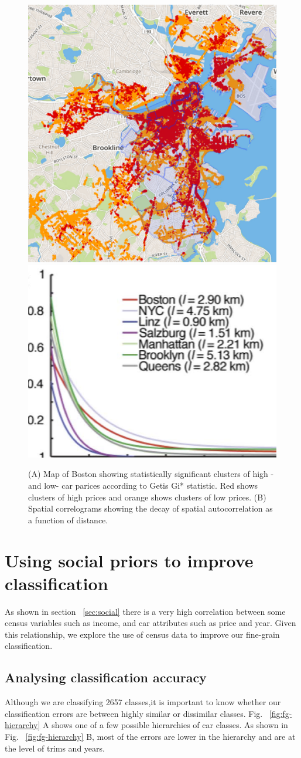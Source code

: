 \documentclass[10pt,twocolumn,letterpaper]{article}
\begin{document}
\begin{figure}[t]
\begin{center}

    \includegraphics[width=0.45\linewidth]{img/boston-hotspot.png}
    \includegraphics[width=0.45\linewidth]{img/autocorr.png}
\end{center}
   \caption {(A)  Map of Boston showing statistically significant clusters of high -and low- car parices according to Getis Gi* statistic. Red shows clusters of high prices and orange shows clusters of low prices. (B) Spatial correlograms showing the decay of spatial autocorrelation as a function of distance.}
\label{fig:boston-hotspot}
\end{figure}

\section{Using social priors to improve classification}

As shown in section ~\ref{sec:social} there is a very high correlation between some census variables such as income, and car attributes such as price and year. Given this relationship, we explore the use of census data to improve our fine-grain classification.
\subsection{Analysing classification accuracy}
Although we are classifying 2657 classes,it is important to know whether our classification errors are between highly similar or dissimilar classes. Fig. ~\ref{fig:fg-hierarchy} A shows one of a few possible hierarchies of car classes. As shown in Fig. ~\ref{fig:fg-hierarchy} B, most of the errors are lower in the hierarchy and are at the level of trims and years.  
\end{document}
